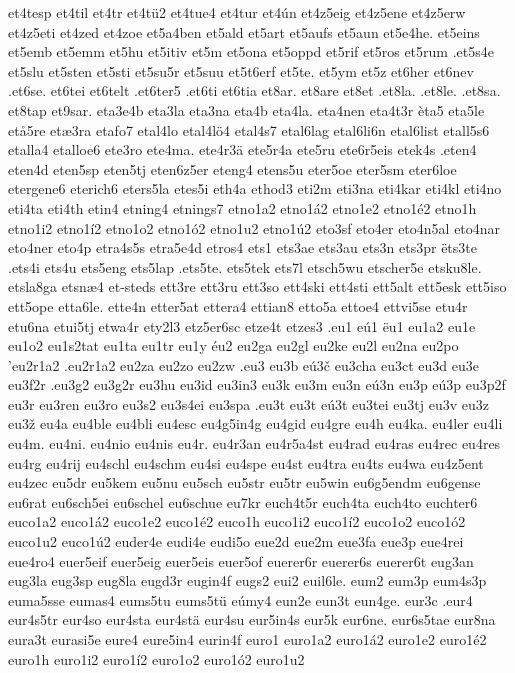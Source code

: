 et4tesp
et4til
et4tr
et4tü2
et4tue4
et4tur
et4ún
et4z5eig
et4z5ene
et4z5erw
et4z5eti
et4zed
et4zoe
et5a4ben
et5ald
et5art
et5aufs
et5aun
et5e4he.
et5eins
et5emb
et5emm
et5hu
et5itiv
et5m
et5ona
et5oppd
et5rif
et5ros
et5rum
.et5s4e
et5slu
et5sten
et5sti
et5su5r
et5suu
et5t6erf
et5te.
et5ym
et5z
et6her
et6nev
.et6se.
et6tei
et6telt
.et6ter5
.et6ti
et6tia
et8ar.
et8are
et8et
.et8la.
.et8le.
.et8sa.
et8tap
et9sar.
eta3e4b
eta3la
eta3na
eta4b
eta4la.
eta4nen
eta4t3r
èta5
eta5le
etå5re
etæ3ra
etafo7
etal4lo
etal4lö4
etal4s7
etal6lag
etal6li6n
etal6list
etall5s6
etalla4
etalloe6
ete3ro
ete4ma.
ete4r3ä
ete5r4a
ete5ru
ete6r5eis
etek4s
.eten4
eten4d
eten5sp
eten5tj
eten6z5er
eteng4
etens5u
eter5oe
eter5sm
eter6loe
etergene6
eterich6
eters5la
etes5i
eth4a
ethod3
eti2m
eti3na
eti4kar
eti4kl
eti4no
eti4ta
eti4th
etin4
etning4
etnings7
etno1a2
etno1á2
etno1e2
etno1é2
etno1h
etno1i2
etno1í2
etno1o2
etno1ó2
etno1u2
etno1ú2
eto3sf
eto4er
eto4n5al
eto4nar
eto4ner
eto4p
etra4s5s
etra5e4d
etros4
ets1
ets3ae
ets3au
ets3n
ets3pr
ëts3te
.ets4i
ets4u
ets5eng
ets5lap
.ets5te.
ets5tek
ets7l
etsch5wu
etscher5e
etsku8le.
etsla8ga
etsnæ4
et-steds
ett3re
ett3ru
ett3so
ett4ski
ett4sti
ett5alt
ett5esk
ett5iso
ett5ope
etta6le.
ette4n
etter5at
ettera4
ettian8
etto5a
ettoe4
ettvi5se
etu4r
etu6na
etui5tj
etwa4r
ety2l3
etz5er6sc
etze4t
etzes3
.eu1
eú1
ëu1
eu1a2
eu1e
eu1o2
eu1s2tat
eu1ta
eu1tr
eu1y
éu2
eu2ga
eu2gl
eu2ke
eu2l
eu2na
eu2po
'eu2r1a2
.eu2r1a2
eu2za
eu2zo
eu2zw
.eu3
eu3b
eú3č
eu3cha
eu3ct
eu3d
eu3e
eu3f2r
.eu3g2
eu3g2r
eu3hu
eu3id
eu3in3
eu3k
eu3m
eu3n
eú3n
eu3p
eú3p
eu3p2f
eu3r
eu3ren
eu3ro
eu3s2
eu3s4ei
eu3spa
.eu3t
eu3t
eú3t
eu3tei
eu3tj
eu3v
eu3z
eu3ž
eu4a
eu4ble
eu4bli
eu4esc
eu4g5in4g
eu4gid
eu4gre
eu4h
eu4ka.
eu4ler
eu4li
eu4m.
eu4ni.
eu4nio
eu4nis
eu4r.
eu4r3an
eu4r5a4st
eu4rad
eu4ras
eu4rec
eu4res
eu4rg
eu4rij
eu4schl
eu4schm
eu4si
eu4spe
eu4st
eu4tra
eu4ts
eu4wa
eu4z5ent
eu4zec
eu5dr
eu5kem
eu5nu
eu5sch
eu5str
eu5tr
eu5win
eu6g5endm
eu6gense
eu6rat
eu6sch5ei
eu6schel
eu6schue
eu7kr
euch4t5r
euch4ta
euch4to
euchter6
euco1a2
euco1á2
euco1e2
euco1é2
euco1h
euco1i2
euco1í2
euco1o2
euco1ó2
euco1u2
euco1ú2
euder4e
eudi4e
eudi5o
eue2d
eue2m
eue3fa
eue3p
eue4rei
eue4ro4
euer5eif
euer5eig
euer5eis
euer5of
euerer6r
euerer6s
euerer6t
eug3an
eug3la
eug3sp
eug8la
eugd3r
eugin4f
eugs2
eui2
euil6le.
eum2
eum3p
eum4s3p
euma5sse
eumas4
eums5tu
eums5tü
eúmy4
eun2e
eun3t
eun4ge.
eur3c
.eur4
eur4s5tr
eur4so
eur4sta
eur4stä
eur4su
eur5in4s
eur5k
eur6ne.
eur6s5tae
eur8na
eura3t
eurasi5e
eure4
eure5in4
eurin4f
euro1
euro1a2
euro1á2
euro1e2
euro1é2
euro1h
euro1i2
euro1í2
euro1o2
euro1ó2
euro1u2
